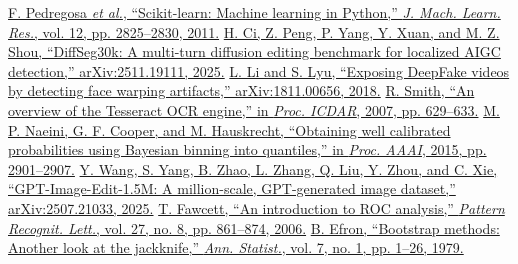  \href{https://jmlr.org/papers/v12/pedregosa11a.html}{F. Pedregosa \emph{et al.}, ``Scikit-learn: Machine learning in Python,'' \emph{J. Mach. Learn. Res.}, vol. 12, pp. 2825--2830, 2011.}
 \href{https://arxiv.org/abs/2511.19111}{H. Ci, Z. Peng, P. Yang, Y. Xuan, and M. Z. Shou, ``DiffSeg30k: A multi-turn diffusion editing benchmark for localized AIGC detection,'' arXiv:2511.19111, 2025.}
 \href{https://arxiv.org/abs/1811.00656}{L. Li and S. Lyu, ``Exposing DeepFake videos by detecting face warping artifacts,'' arXiv:1811.00656, 2018.}
 \href{https://doi.org/10.1109/ICDAR.2007.4376991}{R. Smith, ``An overview of the Tesseract OCR engine,'' in \emph{Proc. ICDAR}, 2007, pp. 629--633.}
 \href{https://doi.org/10.1609/aaai.v29i1.9602}{M. P. Naeini, G. F. Cooper, and M. Hauskrecht, ``Obtaining well calibrated probabilities using Bayesian binning into quantiles,'' in \emph{Proc. AAAI}, 2015, pp. 2901--2907.}
 \href{https://arxiv.org/abs/2507.21033}{Y. Wang, S. Yang, B. Zhao, L. Zhang, Q. Liu, Y. Zhou, and C. Xie, ``GPT-Image-Edit-1.5M: A million-scale, GPT-generated image dataset,'' arXiv:2507.21033, 2025.}
 \href{https://doi.org/10.1016/j.patrec.2005.10.010}{T. Fawcett, ``An introduction to ROC analysis,'' \emph{Pattern Recognit. Lett.}, vol. 27, no. 8, pp. 861--874, 2006.}
 \href{https://doi.org/10.1214/aos/1176344552}{B. Efron, ``Bootstrap methods: Another look at the jackknife,'' \emph{Ann. Statist.}, vol. 7, no. 1, pp. 1--26, 1979.}

